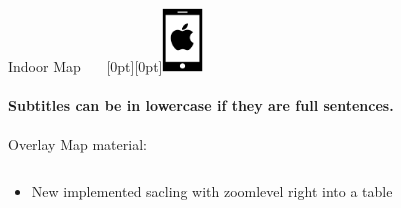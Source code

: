 \documentclass[11pt]{beamer}
\begin{document}
\begin{frame}{Indoor Map ~~~\raisebox{-10pt}[0pt][0pt]{\includegraphics[width=0.08\textwidth]{tech-stack-apple}}}

\framesubtitle{Subtitles can be in lowercase if they are full sentences.}
Overlay Map material:

  \begin{columns}[T]
  \begin{column}{.6\textwidth}
  \begin{itemize}
    \item New implemented sacling with zoomlevel right into a table
  \end{itemize}
  \end{column}
  \begin{column}{.4\textwidth}

\end{column}
\end{columns}
\end{frame}
\end{document}
